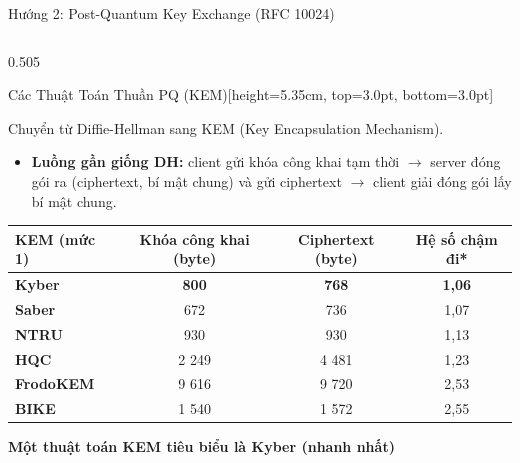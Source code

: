 \documentclass[aspectratio=169, 10pt]{beamer}
\begin{document}
\begin{frame}{Hướng 2: Post-Quantum Key Exchange (RFC 10024)}
	\begin{columns}[T]
		\begin{column}{0.505\textwidth}
			\begin{accentcard}[uetblue]{Các Thuật Toán Thuần PQ (KEM)}[height=5.35cm, top=3.0pt, bottom=3.0pt]
				\raggedright
				{\fontsize{5.8pt}{7.2pt}\selectfont Chuyển từ Diffie-Hellman sang KEM (Key Encapsulation Mechanism).\par}
				\setlength{\leftmargini}{9pt}
				\begin{itemize}\setlength{\itemsep}{1.5pt}\setlength{\topsep}{0pt}\fontsize{5.5pt}{6.8pt}\selectfont
					\item \textbf{Luồng gần giống DH:} client gửi khóa công khai tạm thời $\rightarrow$ server đóng gói ra (ciphertext, bí mật chung) và gửi ciphertext $\rightarrow$ client giải đóng gói lấy bí mật chung.
				\end{itemize}
				\vspace{1.5pt}
				\centering
				\fontsize{5.2pt}{6.4pt}\selectfont
				\renewcommand{\arraystretch}{1.06}
				\setlength{\tabcolsep}{2.5pt}
				\begin{tabularx}{\linewidth}{>{\raggedright\arraybackslash}X c c c}
					\toprule
					\rowcolor{uetaccentbg}
					\textbf{\color{uetblue}KEM (mức 1)} & \textbf{\color{uetblue}Khóa công khai (byte)} & \textbf{\color{uetblue}Ciphertext (byte)} & \textbf{\color{uetblue}Hệ số chậm đi*} \\
					\midrule
					\rowcolor{uetgreenbg}
					\textbf{Kyber} & \textbf{800} & \textbf{768} & \textbf{1,06} \\
					\textbf{Saber} & 672 & 736 & 1,07 \\
					\rowcolor{uetlightgray}
					\textbf{NTRU} & 930 & 930 & 1,13 \\
					\textbf{HQC} & 2 249 & 4 481 & 1,23 \\
					\rowcolor{uetlightgray}
					\textbf{FrodoKEM} & 9 616 & 9 720 & 2,53 \\
					\textbf{BIKE} & 1 540 & 1 572 & 2,55 \\
					\bottomrule
				\end{tabularx}
				\vspace{2.0pt}
				\raggedright
				{\fontsize{5.5pt}{6.8pt}\selectfont\textbf{\color{uetdarkgreen}Một thuật toán KEM tiêu biểu là Kyber (nhanh nhất)}\par}
			\end{accentcard}
		\end{column}


\end{columns}
\end{frame}
\end{document}
